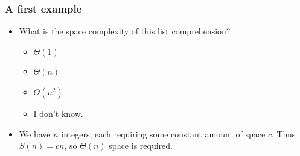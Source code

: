 \begin{frame}
	\frametitle{A first example}
	
			\begin{itemize}
				\item What is the \alert{space} complexity of this list comprehension?
			
			\begin{itemize}
				\item $\Theta(1)$
				\item $\Theta(n)$ 
				\item $\Theta(n^2)$
				\item I don't know.
			\end{itemize}
				\item We have $n$ integers, each requiring some constant amount of space $c$. Thus $S(n) = cn$, so $\Theta(n)$ space is
		required.
			\end{itemize}
		
		
\end{frame}




